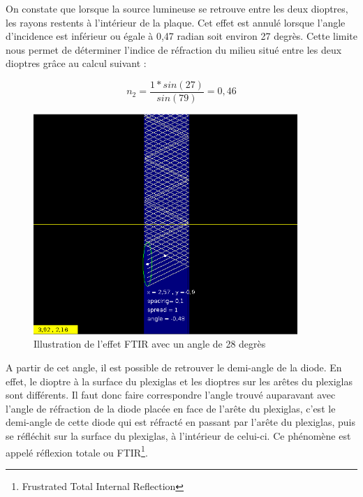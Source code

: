 On constate que lorsque la source lumineuse se retrouve entre les deux dioptres, les rayons restents à l'intérieur de la plaque.
Cet effet est annulé lorsque l'angle d'incidence est inférieur ou égale à 0,47 radian soit environ 27 degrès.
Cette limite nous permet de déterminer l'indice de réfraction du milieu situé entre les deux dioptres 
grâce au calcul suivant : 

\begin{framed}
$$ n_2 = \frac{1 * sin(27)}{sin(79)} = 0,46 $$
\end{framed}

\begin{figure}[H]
      \center
      \includegraphics[width=10cm]{ressources/tp1/reflexion_totale.png}
      \caption{Illustration de l'effet FTIR avec un angle de 28 degrès}
\end{figure}

A partir de cet angle, il est possible de retrouver le demi-angle de la diode. En effet, le dioptre à la surface 
du plexiglas et les dioptres sur les arêtes du plexiglas sont différents. Il faut donc faire correspondre l’angle trouvé 
auparavant avec l’angle de réfraction de la diode placée en face de l’arête du plexiglas, c’est le demi-angle de cette 
diode qui est réfracté en passant par l’arête du plexiglas, puis se réfléchit sur la surface du plexiglas, à l'intérieur 
de celui-ci. Ce phénomène est appelé réflexion totale ou FTIR\footnote{Frustrated Total Internal Reflection}.




